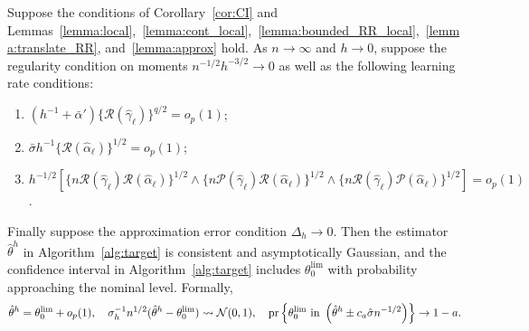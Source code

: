 \begin{corollary}\label{cor:CI_local}
Suppose the conditions of Corollary~\ref{cor:CI} and Lemmas~\ref{lemma:local},~\ref{lemma:cont_local},~\ref{lemma:bounded_RR_local},~\ref{lemma:translate_RR}, and~\ref{lemma:approx} hold. As $n\rightarrow \infty$ and $h\rightarrow 0$, suppose the regularity condition on  moments $n^{-1/2}h^{-3/2}\rightarrow 0$ as well as the following learning rate conditions:
\begin{enumerate}
    \item $\left(h^{-1}+\bar{\alpha}'\right)\{\mathcal{R}(\hat{\gamma}_{\ell})\}^{q/2}=o_p(1)$;
    \item $\bar{\sigma}h^{-1}\{\mathcal{R}(\hat{\alpha}_{\ell})\}^{1/2}=o_p(1)$;
    \item $h^{-1/2}[\{n \mathcal{R}(\hat{\gamma}_{\ell}) \mathcal{R}(\hat{\alpha}_{\ell})\}^{1/2} \wedge \{n\mathcal{P}(\hat{\gamma}_{\ell})\mathcal{R}(\hat{\alpha}_{\ell})\}^{1/2} \wedge \{n\mathcal{R}(\hat{\gamma}_{\ell})\mathcal{P}(\hat{\alpha}_{\ell})\}^{1/2}] =o_p(1)$.
\end{enumerate}
Finally suppose the approximation error condition $\Delta_h \rightarrow 0$. Then the estimator $\hat{\theta}^h$ in Algorithm~\ref{alg:target} is consistent and asymptotically Gaussian, and the confidence interval in Algorithm~\ref{alg:target} includes $\theta^{\lim}_0$ with probability approaching the nominal level. Formally,
$$
\hat{\theta}^h=\theta^{\lim}_0+o_p(1),\quad \sigma_h^{-1}n^{1/2}(\hat{\theta}^h-\theta^{\lim}_0)\leadsto \mathcal{N}(0,1),\quad  \text{\normalfont pr} \left\{\theta^{\lim}_0 \text{ in }  \left(\hat{\theta}^h\pm c_a\hat{\sigma} n^{-1/2} \right)\right\}\rightarrow 1-a.
$$
\end{corollary}